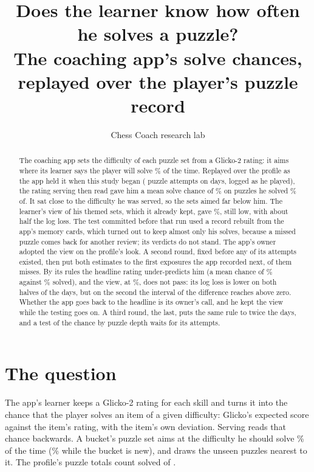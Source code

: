 \documentclass[11pt]{article}
\title{Does the learner know how often he solves a puzzle?\\[0.3em]
\large The coaching app's solve chances, replayed over the player's puzzle record}
\author{Chess Coach research lab}
\date{}
\begin{document}
\maketitle

\begin{abstract}
The coaching app sets the difficulty of each puzzle set from a Glicko-2 rating: it aims where its
learner says the player will solve \TargetCore\% of the time. Replayed over the profile as the app
held it when this study began (\PAttempts{} puzzle attempts on \PDays{} days, logged as he
played), the rating serving then read gave him a mean solve chance of \PHead\% on puzzles he
solved \PSolved\% of. It sat close to the difficulty he was served, so the sets aimed far below
him. The learner's view of his themed sets, which it already kept, gave \PView\%, still low, with
about half the log loss. The test committed before that run used a record rebuilt from the app's
memory cards, which turned out to keep almost only his solves, because a missed puzzle comes back
for another review; its verdicts do not stand. The app's owner adopted the view on the profile's
look. A second round, fixed before any of its attempts existed, then put both estimates to the
\TwoAttempts{} first exposures the app recorded next, \TwoMisses{} of them misses. By its rules
the headline rating under-predicts him (a mean chance of \TwoHead\% against \TwoSolved\% solved),
and the view, at \TwoView\%, does not pass: its log loss is lower on both halves of the days, but
on the second the interval of the difference reaches above zero. Whether the app goes back to the
headline is its owner's call, and he kept the view while the testing goes on. A third round, the
last, puts the same rule to twice the days, and a test of the chance by puzzle depth waits for its
attempts.
\end{abstract}

\section{The question}

The app's learner keeps a Glicko-2 rating for each skill and turns it into the chance that the
player solves an item of a given difficulty: Glicko's expected score against the item's rating,
with the item's own deviation. Serving reads that chance backwards. A bucket's puzzle set aims at
the difficulty he should solve \TargetCore\% of the time (\TargetNew\% while the bucket is new),
and draws the unseen puzzles nearest to it. The profile's puzzle totals count \TotalCorrect{}
solved of \TotalAttempts.
\end{document}
